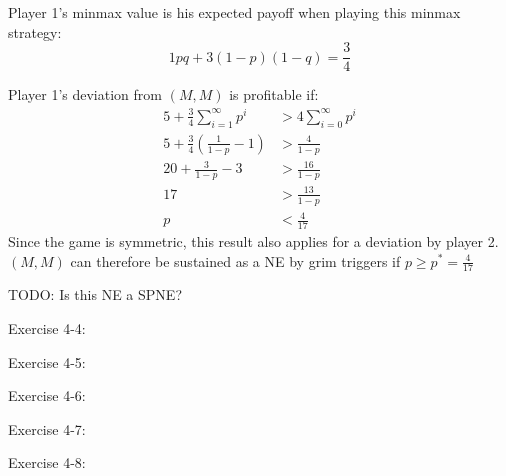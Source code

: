 \documentclass[../main.tex]{subfiles}
\begin{document}
\begin{solution}
\begin{enumerate}
Player 1's minmax value is his expected payoff when playing this minmax strategy:
\[
1 p q + 3 (1-p) (1-q) = \frac{3}{4}
\]
	
Player 1's deviation from $(M, M)$ is profitable if:
\begin{align*}
5 + \frac{3}{4} \sum\limits_{i=1}^{\infty} p^i &> 4 \sum\limits_{i=0}^{\infty} p^i \\
5 + \frac{3}{4} \left( \frac{1}{1 - p} - 1 \right) &> \frac{4}{1 - p} \\
20 + \frac{3}{1 - p} - 3 &> \frac{16}{1 - p} \\
17 &> \frac{13}{1 - p} \\
p &< \frac{4}{17}
\end{align*}
Since the game is symmetric, this result also applies for a deviation by player 2. \\
$(M, M)$ can therefore be sustained as a NE by grim triggers if $p \geq p^* = \frac{4}{17}$
	
TODO: Is this NE a SPNE?

\end{enumerate}
\end{solution}

\begin{question}
Exercise 4-4:
\end{question}

\begin{solution}
\end{solution}

\begin{question}
Exercise 4-5:
\end{question}

\begin{solution}
\end{solution}

\begin{question}
Exercise 4-6:
\end{question}

\begin{solution}
\end{solution}

\begin{question}
Exercise 4-7:
\end{question}

\begin{solution}
\end{solution}

\begin{question}
Exercise 4-8:
\end{question}

\begin{solution}
\end{solution}
\end{document}
